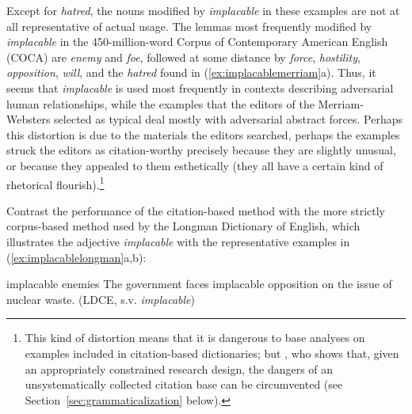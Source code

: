 Except for \textit{hatred}, the nouns  modified by \textit{implacable} in these examples are not at all representative  of actual usage. The lemmas  most frequently modified by \textit{implacable} in the 450\hyp{}million\hyp{}word Corpus of Contemporary American English (COCA) are \textit{enemy} and \textit{foe}, followed at some distance by \textit{force}, \textit{hostility}, \textit{opposition}, \textit{will}, and the \textit{hatred} found in (\ref{ex:implacablemerriam}a). Thus, it seems that \textit{implacable} is used most frequently in contexts describing adversarial human relationships, while the examples that the editors of the Merriam\hyp{}Websters selected as typical deal mostly with adversarial abstract forces. Perhaps this distortion is due to the materials the editors searched, perhaps the examples struck the editors as citation\hyp{}worthy precisely because they are slightly unusual, or because they appealed to them esthetically (they all have a certain kind of rhetorical flourish).\footnote{This kind of distortion means that it is dangerous to base analyses on examples included in citation\hyp{}based dictionaries;  but \citet[cf.][]{lindquist_corpus_2004-1}, who shows that, given an appropriately constrained research design,  the dangers of an unsystematically collected citation base can be circumvented (see Section~\ref{sec:grammaticalization} below).}

Contrast the performance of the citation\hyp{}based method with the more strictly corpus\hyp{}based method used by the Longman Dictionary  of English, which illustrates the adjective  \textit{implacable} with the representative  examples in (\ref{ex:implacablelongman}a,b):

\begin{exe}
\ex
\begin{xlist}
\label{ex:implacablelongman}
\ex implacable enemies
\ex The government faces implacable opposition on the issue of nuclear waste. (LDCE, s.v. \textit{implacable})
\end{xlist}
\end{exe}

